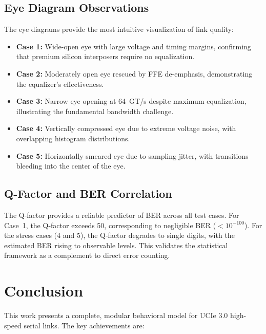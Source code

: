 \documentclass[conference]{IEEEtran}
\begin{document}
\subsection{Eye Diagram Observations}

The eye diagrams provide the most intuitive visualization of link quality:

\begin{itemize}
    \item \textbf{Case 1:} Wide-open eye with large voltage and timing margins, confirming that premium silicon interposers require no equalization.
    \item \textbf{Case 2:} Moderately open eye rescued by FFE de-emphasis, demonstrating the equalizer's effectiveness.
    \item \textbf{Case 3:} Narrow eye opening at 64~GT/s despite maximum equalization, illustrating the fundamental bandwidth challenge.
    \item \textbf{Case 4:} Vertically compressed eye due to extreme voltage noise, with overlapping histogram distributions.
    \item \textbf{Case 5:} Horizontally smeared eye due to sampling jitter, with transitions bleeding into the center of the eye.
\end{itemize}

\subsection{Q-Factor and BER Correlation}

The Q-factor provides a reliable predictor of BER across all test cases. For Case~1, the Q-factor exceeds 50, corresponding to negligible BER ($< 10^{-100}$). For the stress cases (4 and 5), the Q-factor degrades to single digits, with the estimated BER rising to observable levels. This validates the statistical framework as a complement to direct error counting.

\section{Conclusion}

This work presents a complete, modular behavioral model for UCIe 3.0 high-speed serial links. The key achievements are:
\end{document}
